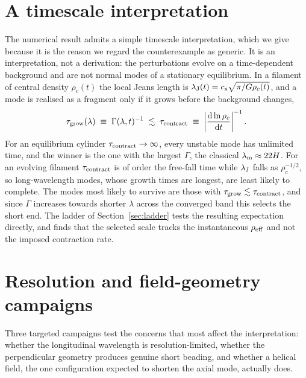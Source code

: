 \documentclass[usenatbib,twoside,twocolumn]{mnras}
\begin{document}
\appendix

\section{A timescale interpretation}
\label{sec:timescale}

The numerical result admits a simple timescale interpretation, which we give because it is the reason we regard the counterexample as generic. It is an interpretation, not a derivation: the perturbations evolve on a time-dependent background and are not normal modes of a stationary equilibrium. In a filament of central density $\rho_c(t)$ the local Jeans length is $\lambda_{\rm J}(t)=c_s\sqrt{\pi/G\rho_c(t)}$, and a mode is realised as a fragment only if it grows before the background changes,
\begin{equation}
\tau_{\rm grow}(\lambda)\;\equiv\;\Gamma(\lambda,t)^{-1}\;\lesssim\;\tau_{\rm contract}\;\equiv\;\left|\frac{{\rm d}\ln\rho_c}{{\rm d}t}\right|^{-1}.
\label{eq:freezeout}
\end{equation}
For an equilibrium cylinder $\tau_{\rm contract}\to\infty$, every unstable mode has unlimited time, and the winner is the one with the largest $\Gamma$, the classical $\lambda_{\rm m}\approx22H$. For an evolving filament $\tau_{\rm contract}$ is of order the free-fall time while $\lambda_{\rm J}$ falls as $\rho_c^{-1/2}$, so long-wavelength modes, whose growth times are longest, are least likely to complete. The modes most likely to survive are those with $\tau_{\rm grow}\lesssim\tau_{\rm contract}$, and since $\Gamma$ increases towards shorter $\lambda$ across the converged band this selects the short end. The ladder of Section~\ref{sec:ladder} tests the resulting expectation directly, and finds that the selected scale tracks the instantaneous $\rho_{\rm eff}$  and not the imposed contraction rate.




\section{Resolution and field-geometry campaigns}
\label{sec:optional_app}

Three targeted campaigns test the concerns that most affect the interpretation: whether the longitudinal wavelength is resolution-limited, whether the perpendicular geometry produces genuine short beading, and whether a helical field, the one configuration expected to shorten the axial mode, actually does.
\end{document}
